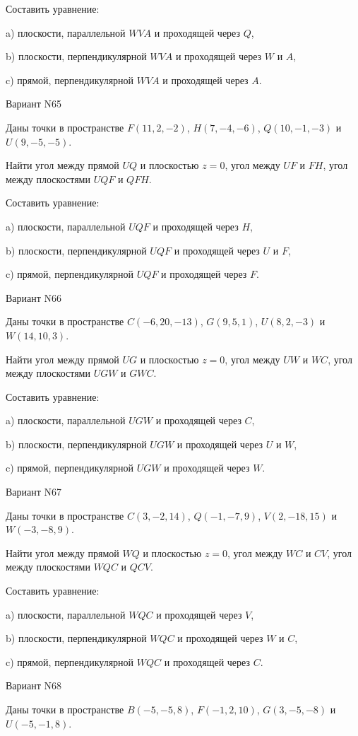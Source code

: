 \documentclass[11pt]{report}
\begin{document}
Составить уравнение: 

a) плоскости, параллельной $WVA$ и проходящей через $Q$,

b) плоскости, перпендикулярной $WVA$ и проходящей через $W$ и $A$,

c) прямой, перпендикулярной $WVA$ и проходящей через $A$.

Вариант N65

Даны точки в пространстве
$F(11, 2, -2)$, $H(7, -4, -6)$, $Q(10, -1, -3)$ и
$U(9, -5, -5)$.

Найти угол между прямой $UQ$ и плоскостью $z = 0$, угол между $UF$ и $FH$, угол между плоскостями $UQF$ 
и $QFH$.

Составить уравнение: 

a) плоскости, параллельной $UQF$ и проходящей через $H$,

b) плоскости, перпендикулярной $UQF$ и проходящей через $U$ и $F$,

c) прямой, перпендикулярной $UQF$ и проходящей через $F$.

Вариант N66

Даны точки в пространстве
$C(-6, 20, -13)$, $G(9, 5, 1)$, $U(8, 2, -3)$ и
$W(14, 10, 3)$.

Найти угол между прямой $UG$ и плоскостью $z = 0$, угол между $UW$ и $WC$, угол между плоскостями $UGW$ 
и $GWC$.

Составить уравнение: 

a) плоскости, параллельной $UGW$ и проходящей через $C$,

b) плоскости, перпендикулярной $UGW$ и проходящей через $U$ и $W$,

c) прямой, перпендикулярной $UGW$ и проходящей через $W$.

Вариант N67

Даны точки в пространстве
$C(3, -2, 14)$, $Q(-1, -7, 9)$, $V(2, -18, 15)$ и
$W(-3, -8, 9)$.

Найти угол между прямой $WQ$ и плоскостью $z = 0$, угол между $WC$ и $CV$, угол между плоскостями $WQC$ 
и $QCV$.

Составить уравнение: 

a) плоскости, параллельной $WQC$ и проходящей через $V$,

b) плоскости, перпендикулярной $WQC$ и проходящей через $W$ и $C$,

c) прямой, перпендикулярной $WQC$ и проходящей через $C$.

Вариант N68

Даны точки в пространстве
$B(-5, -5, 8)$, $F(-1, 2, 10)$, $G(3, -5, -8)$ и
$U(-5, -1, 8)$.
\end{document}
